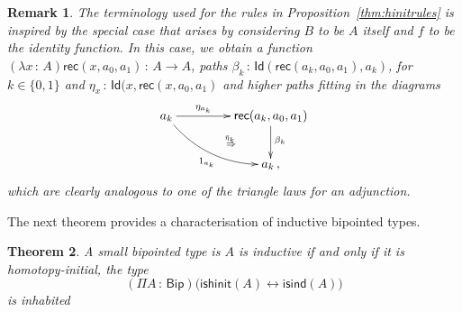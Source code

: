 \documentclass[10pt,a4paper,oneside,reqno]{amsart}
\numberwithin{equation}{section}
\theoremstyle{mythm}
\newtheorem{theorem}{Theorem}[section]
\theoremstyle{mydef}
\theoremstyle{myrmk}
\newtheorem{remark}[theorem]{Remark}
\newcommand{\ie}{\text{i.e.\ }}
\newcommand{\co}{\,{:}\,}
\newcommand{\isbipind}{\mathsf{isind}}
\newcommand{\isbiphinit}{\mathsf{ishinit}}
\newcommand{\Id}{\mathsf{Id}}
\newcommand{\Bip}{\mathsf{Bip}}
\newcommand{\rec}{\mathsf{rec}}
\begin{document}
\begin{remark} \label{thm:etarule} The terminology used for the rules in Proposition~\ref{thm:hinitrules} is
inspired by the special case that arises by considering $B$ to be $A$ itself and $f$ to be the identity function.
In this case, we obtain a function $(\lambda x \co A) \rec(x, a_0, a_1) \co A \to A$, paths $\beta_k \co
\Id( \rec(a_k, a_0, a_1), a_k)$, for $k \in \{ 0, 1 \}$ and $\eta_x \co \Id(x, \rec(x, a_0, a_1)$ and higher paths
fitting in the diagrams
\[
\xymatrix@C=1.5cm{
a_k \ar[r]^-{\eta_{a_k}} \ar@/_1pc/[dr]_{1_{a_k}} \ar@{}[dr]|{\qquad \overset{\bar{\eta}_k\; }{\Rightarrow}} & \rec(a_k, a_0, a_1) \ar[d]^{\beta_k} \\ 
 & a_k\, ,}
 \]
 which are clearly analogous to one of the triangle laws for an adjunction. 
\end{remark} 


The next theorem provides a characterisation of inductive bipointed types.






\begin{theorem}\label{thm:bipointedmain} A small bipointed type 
is  $A$ is inductive if and only if it is homotopy-initial, \ie  the type
\[
(\Pi A \co \Bip) \big(  \isbiphinit(A) \leftrightarrow \isbipind(A) \big)
\] 
is inhabited
\end{theorem}
\end{document}
